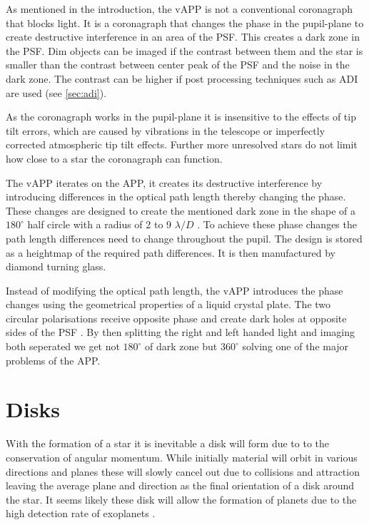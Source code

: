 As mentioned in the introduction, the \ac{vAPP} is not a conventional coronagraph that blocks light. It is a coronagraph that changes the phase in the pupil-plane to create destructive interference in an area of the \ac{PSF}. This creates a dark zone in the \ac{PSF}. Dim objects can be imaged if the contrast between them and the star is smaller than the contrast between center peak of the \ac{PSF} and the noise in the dark zone. The contrast can be higher if post processing techniques such as \ac*{ADI} are used (see \autoref{sec:adi}).

As the coronagraph works in the pupil-plane it is insensitive to the effects of tip tilt errors, which are caused by vibrations in the telescope or imperfectly corrected atmospheric tip tilt effects. Further more unresolved stars do not limit how close to a star the coronagraph can function.

The \ac{vAPP} iterates on the \ac{APP}, it creates its destructive interference by introducing differences in the optical path length thereby changing the phase. These changes are designed to create the mentioned dark zone in the shape of a $180^\circ$ half circle with a radius of 2 to 9 $\lambda/D$ \cite{vapp_doelman}. To achieve these phase changes the path length differences need to change throughout the pupil. The design is stored as a heightmap of the required path differences. It is then manufactured by diamond turning glass. 

Instead of modifying the optical path length, the \ac{vAPP} introduces the phase changes using the geometrical properties of a liquid crystal plate. The two circular polarisations receive opposite phase and create dark holes at opposite sides of the \ac{PSF} \cite{vapp_snik} \cite{vapp_otten} \cite{vapp_doelman}. By then splitting the right and left handed light and imaging both seperated we get not $180^\circ$ of dark zone but $360^\circ$ solving one of the major problems of the \ac{APP}.






\section{Disks} %
\label{sec:disks} %

With the formation of a star it is inevitable a disk will form due to to the conservation of angular momentum. While initially material will orbit in various directions and planes these will slowly cancel out due to collisions and attraction leaving the average plane and direction as the final orientation of a disk around the star. It seems likely these disk will allow the formation of planets due to the high detection rate of exoplanets \cite{williams}.

